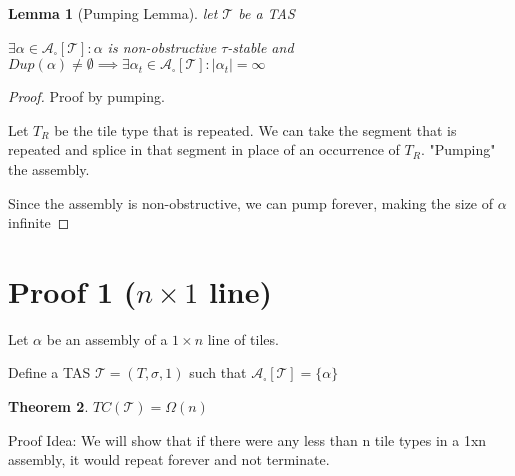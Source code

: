 \documentclass[12pt]{article}
\newtheorem{theorem}{Theorem}
\newtheorem{lemma}[theorem]{Lemma}
\begin{document}
\begin{lemma}[Pumping Lemma] 

    let $\mathcal{T}$ be a TAS

    $\exists \alpha \in \mathcal{A}_\square[\mathcal{T}] : \alpha$ is non-obstructive $\tau$-stable and $Dup(\alpha) \ne \emptyset \implies \exists \alpha_t \in \mathcal{A}_\square[\mathcal{T}] : |\alpha_t| = \infty$
\end{lemma}

\begin{proof}
    Proof by pumping. 

    Let $T_R$ be the tile type that is repeated. We can take the segment that is repeated and splice in that segment in place of an occurrence of $T_R$. "Pumping" the assembly. 

    Since the assembly is non-obstructive, we can pump forever, making the size of $\alpha$ infinite 
\end{proof}

\section*{Proof 1 ($n \times 1 $ line)}

Let $\alpha$ be an assembly of a $1 \times n$ line of tiles.

Define a TAS $\mathcal{T} = (T, \sigma, 1)$ such that $\mathcal{A}_\square[\mathcal{T}] = \{ \alpha \}$

\begin{theorem}
	$TC(\mathcal{T}) = \Omega(n)$
\end{theorem}

Proof Idea:  We will show that if there were any less than n tile types in a 1xn assembly, it would repeat forever and not terminate.
\end{document}
